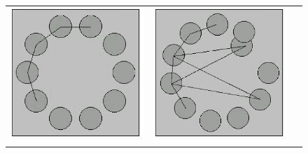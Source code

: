 \begin{figure}
\begin{tabular}{lll}
\includegraphics[angle=0,scale=0.3]{heatavi1.eps} & \includegraphics[angle=0,scale=0.3]{heatavi2.eps} &

\end{tabular}
\end{figure}
